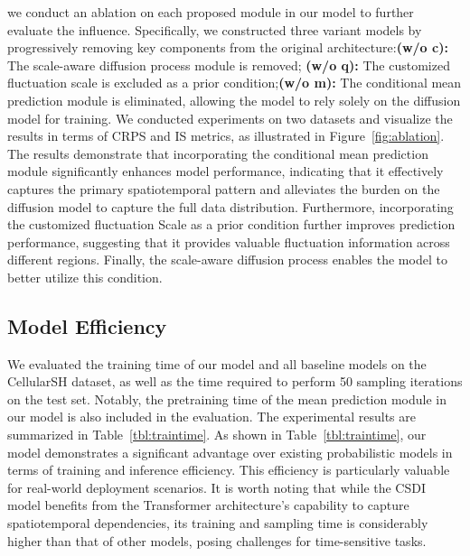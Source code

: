 we conduct an ablation on each proposed module in our model to further evaluate the influence. Specifically, we constructed three variant models by progressively removing key components from the original architecture:\textbf{(w/o c):} The scale-aware diffusion process module is removed; \textbf{(w/o q):} The customized fluctuation scale is excluded as a prior condition;\textbf{(w/o m):} The conditional mean prediction module is eliminated, allowing the model to rely solely on the diffusion model for training.
We conducted experiments on two datasets and visualize the results in terms of CRPS and IS metrics, as illustrated in Figure~\ref{fig:ablation}. The results demonstrate that incorporating the conditional mean prediction module significantly enhances model performance, indicating that it effectively captures the primary spatiotemporal pattern and alleviates the burden on the diffusion model to capture the full data distribution. Furthermore, incorporating the customized fluctuation Scale as a prior condition further improves prediction performance, suggesting that it provides valuable fluctuation information across different regions. Finally, the scale-aware diffusion process enables the model to better utilize this condition.



\subsection{Model Efficiency}
\label{sc:efficiency}

We evaluated the training time of our model and all baseline models on the CellularSH dataset, as well as the time required to perform 50 sampling iterations on the test set. Notably, the pretraining time of the mean prediction module in our model is also included in the evaluation. The experimental results are summarized in Table~\ref{tbl:traintime}. As shown in Table~\ref{tbl:traintime}, our model demonstrates a significant advantage over existing probabilistic models in terms of training and inference efficiency. This efficiency is particularly valuable for real-world deployment scenarios. It is worth noting that while the CSDI model benefits from the Transformer architecture's capability to capture spatiotemporal dependencies, its training and sampling time is considerably higher than that of other models, posing challenges for time-sensitive tasks.





